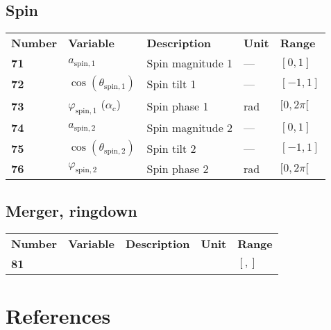 \documentclass[10pt]{article}
\begin{document}
\subsection{Spin}
\begin{tabular}{lllll}
  \textbf{Number} & \textbf{Variable} & \textbf{Description} & \textbf{Unit} & \textbf{Range} \\
  \textbf{71} & $a_\mathrm{spin,1}$  & Spin magnitude 1 & --- & $[0,1]$ \\
  \textbf{72} & $\cos(\theta_\mathrm{spin,1})$  & Spin tilt 1 & --- & $[-1,1]$ \\
  \textbf{73} & $\varphi_\mathrm{spin,1}$  ($\alpha_\mathrm{c}$)  & Spin phase 1 & rad & $[0,2\pi[$ \\
  \textbf{74} & $a_\mathrm{spin,2}$  & Spin magnitude 2 & --- & $[0,1]$ \\
  \textbf{75} & $\cos(\theta_\mathrm{spin,2})$  & Spin tilt 2 & --- & $[-1,1]$ \\
  \textbf{76} & $\varphi_\mathrm{spin,2}$  & Spin phase 2 & rad & $[0,2\pi[$ \\
\end{tabular}

\subsection{Merger, ringdown}
\begin{tabular}{lllll}
  \textbf{Number} & \textbf{Variable} & \textbf{Description} & \textbf{Unit} & \textbf{Range} \\
  \textbf{81} &   & & & $[,]$ \\
\end{tabular}




\section*{References}

\end{document}
